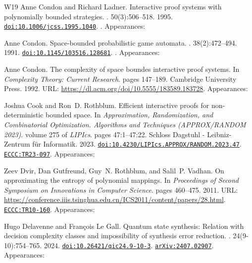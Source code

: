 \documentclass[10pt,a4paper]{article}
\numberwithin{equation}{section}
\numberwithin{figure}{section}
\begin{document}
\begin{thebibliography}{{}W19}
Anne Condon and Richard Ladner.
\newblock Interactive proof systems with polynomially bounded strategies.
. 50(3):506--518. 1995.
\newblock \href {https://doi.org/10.1006/jcss.1995.1040} {\texttt{doi:10.1006/jcss.1995.1040}}. . Appearances:\!

Anne Condon.
\newblock Space-bounded probabilistic game automata.
. 38(2):472--494. 1991.
\newblock \href {https://doi.org/10.1145/103516.128681} {\texttt{doi:10.1145/103516.128681}}. . Appearances:\!

Anne Condon.
\newblock The complexity of space boundes interactive proof systems.
\newblock In {\em Complexity Theory: Current Research}. pages 147--189. Cambridge University Press. 1992.
\newblock URL: \url{https://dl.acm.org/doi/10.5555/183589.183728}. Appearances:\!

Joshua Cook and Ron~D. Rothblum.
\newblock Efficient interactive proofs for non-deterministic bounded space.
\newblock In {\em Approximation, Randomization, and Combinatorial Optimization. Algorithms and Techniques (APPROX/RANDOM 2023)}. volume 275 of {\em LIPIcs}. pages 47:1--47:22. Schloss Dagstuhl - Leibniz-Zentrum f{\"{u}}r Informatik. 2023.
\newblock \href {https://doi.org/10.4230/LIPIcs.APPROX/RANDOM.2023.47} {\texttt{doi:10.4230/LIPIcs.APPROX/RANDOM.2023.47}}. \href {https://eccc.weizmann.ac.il/report/2023/097} {\texttt{ECCC:TR23-097}}. Appearances:\!

Zeev Dvir, Dan Gutfreund, Guy~N. Rothblum, and Salil~P. Vadhan.
\newblock On approximating the entropy of polynomial mappings.
\newblock In {\em Proceedings of Second Symposium on Innovations in Computer Science}. pages 460--475. 2011.
\newblock URL: \url{https://conference.iiis.tsinghua.edu.cn/ICS2011/content/papers/28.html}. \href {https://eccc.weizmann.ac.il/report/2010/160} {\texttt{ECCC:TR10-160}}. Appearances:\!

Hugo Delavenne and Fran{\c{c}}ois {Le Gall}.
\newblock Quantum state synthesis: Relation with decision complexity classes and impossibility of synthesis error reduction.
. 24(9-10):754--765. 2024.
\newblock \href {https://doi.org/10.26421/qic24.9-10-3} {\texttt{doi:10.26421/qic24.9-10-3}}. \href {https://arxiv.org/abs/2407.02907} {\texttt{arXiv:2407.02907}}. Appearances:\!


\end{thebibliography}
\end{document}
